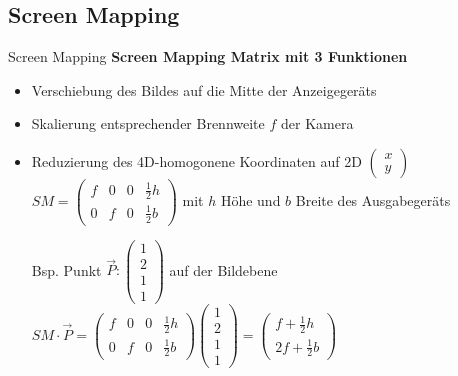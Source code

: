 \documentclass[10pt,aspectratio=169]{beamer}
\begin{document}
  \subsection{Screen Mapping}
  \begin{frame}{Screen Mapping}
    \textbf{Screen Mapping Matrix mit 3 Funktionen}
    \begin{itemize}
      \item Verschiebung des Bildes auf die Mitte der Anzeigegeräts
      \item Skalierung entsprechender Brennweite $f$ der Kamera
      \item Reduzierung des 4D-homogonene Koordinaten auf 2D $\begin{pmatrix}
        x\\y
      \end{pmatrix}$\\
      $SM = \begin{pmatrix}
        f & 0 & 0 & \frac{1}{2}h\\
        0 & f & 0 & \frac{1}{2}b
      \end{pmatrix}$ mit $h$ Höhe und $b$ Breite des Ausgabegeräts
      \begin{center}        
        Bsp. Punkt $\vec{P}: \begin{pmatrix}
          1\\2\\1\\1
        \end{pmatrix}$ auf der Bildebene\\
        $SM \cdot \vec{P} = \begin{pmatrix}
          f & 0 & 0 & \frac{1}{2}h\\
          0 & f & 0 & \frac{1}{2}b
        \end{pmatrix}
        \begin{pmatrix}
          1\\2\\1\\1
        \end{pmatrix}
        = \begin{pmatrix}
          f + \frac{1}{2}h\\
          2f + \frac{1}{2}b
        \end{pmatrix}$
      \end{center}
    \end{itemize}
  \end{frame}
\end{document}
